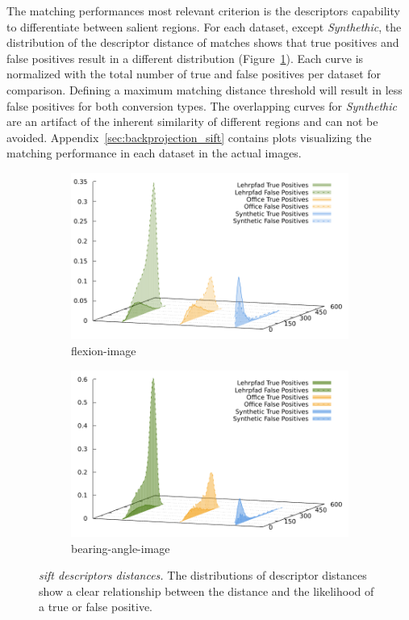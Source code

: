 The matching performances most relevant criterion is the descriptors capability to differentiate between salient regions.
For each dataset, except \emph{Synthethic}, the distribution of the descriptor distance of matches shows that true positives and false positives result in a different distribution (Figure~\ref{fig:sift_descriptor_distance}).
Each curve is normalized with the total number of true and false positives per dataset for comparison.
Defining a maximum matching distance threshold will result in less false positives for both conversion types.
The overlapping curves for \emph{Synthethic} are an artifact of the inherent similarity of different regions and can not be avoided.
Appendix~\ref{sec:backprojection_sift} contains plots visualizing the matching performance in each dataset in the actual images.
\begin{figure}[H]
\begin{subfigure}[t]{0.45\linewidth}
    \includegraphics[width=\linewidth]{chapter06/results/SIFT/flexion/descriptor_distances.pdf}%
    \caption{\gls{flexion-image}}
\end{subfigure}\quad
\begin{subfigure}[t]{0.45\linewidth}
    \includegraphics[width=\linewidth]{chapter06/results/SIFT/bearing/descriptor_distances.pdf}%
    \caption{\gls{bearing-angle-image}}
\end{subfigure}
\caption[\acrshort{sift} descriptors distances]{\emph{\acrshort{sift} descriptors distances.} The distributions of descriptor distances show a clear relationship between the distance and the likelihood of a true or false positive.}\label{fig:sift_descriptor_distance}
\end{figure}
